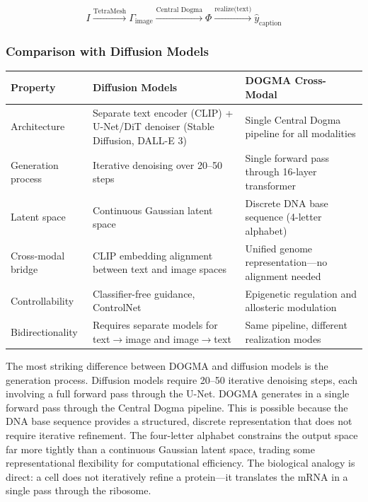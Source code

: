 \begin{equation}
I \xrightarrow{\text{TetraMesh}} \Gamma_{\text{image}} \xrightarrow{\text{Central Dogma}} \Phi \xrightarrow{\text{realize(text)}} \hat{y}_{\text{caption}}
\end{equation}

\subsubsection{Comparison with Diffusion Models}

\begin{center}
\renewcommand{\arraystretch}{1.15}
\begin{tabularx}{0.95\textwidth}{l Y Y}
\toprule
\textbf{Property} & \textbf{Diffusion Models} & \textbf{DOGMA Cross-Modal} \\
\midrule
Architecture & Separate text encoder (CLIP) + U-Net/DiT denoiser (Stable Diffusion, DALL-E 3) & Single Central Dogma pipeline for all modalities \\
Generation process & Iterative denoising over 20--50 steps & Single forward pass through 16-layer transformer \\
Latent space & Continuous Gaussian latent space & Discrete DNA base sequence (4-letter alphabet) \\
Cross-modal bridge & CLIP embedding alignment between text and image spaces & Unified genome representation---no alignment needed \\
Controllability & Classifier-free guidance, ControlNet & Epigenetic regulation and allosteric modulation \\
Bidirectionality & Requires separate models for text$\to$image and image$\to$text & Same pipeline, different realization modes \\
\bottomrule
\end{tabularx}
\end{center}

\begin{keyinsight}
The most striking difference between DOGMA and diffusion models is the generation process. Diffusion models require 20--50 iterative denoising steps, each involving a full forward pass through the U-Net. DOGMA generates in a single forward pass through the Central Dogma pipeline. This is possible because the DNA base sequence provides a structured, discrete representation that does not require iterative refinement. The four-letter alphabet constrains the output space far more tightly than a continuous Gaussian latent space, trading some representational flexibility for computational efficiency. The biological analogy is direct: a cell does not iteratively refine a protein---it translates the mRNA in a single pass through the ribosome.
\end{keyinsight}

